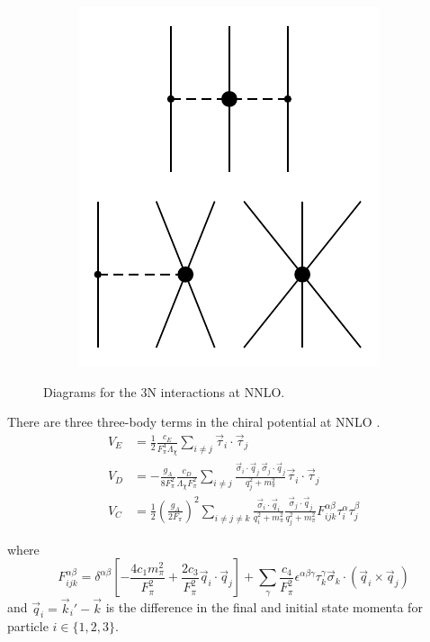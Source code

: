 \documentclass[%
 preprint,
 amsmath,amssymb,
 aps,
]{revtex4-1}
\begin{document}
\begin{figure}
\begin{subfigure}{0.25\textwidth}
\includegraphics[page=2]{Figures/3NFDiagrams}
\end{subfigure}
\caption{\label{fig:3NF}Diagrams for the 3N interactions at NNLO.}
\end{figure}

There are three three-body terms in the chiral potential at NNLO \cite{PhysRevC.66.064001}. 
\begin{align}
V_E&=\frac{1}{2}\frac{c_E }{F_\pi^4\Lambda_\chi}\sum_{i\neq j} \vec{\tau}_i\cdot\vec{\tau}_j \label{eq:V_E} \\
V_D&=-\frac{ g_A}{8F_\pi^2}\frac{c_D}{\Lambda_\chi F_\pi^2}\sum_{i\neq j } \frac{ \vec{\sigma}_i\cdot\vec{q}_j\:\vec{\sigma}_j\cdot\vec{q}_j }{q^2_j+m_\pi^2} \vec{\tau}_i\cdot\vec{\tau}_j \label{eq:V_D}\\
V_{C} &= \frac{1}{2}\left(\frac{g_A}{2F_\pi}\right)^2\sum_{i\neq j \neq k} \frac{ \vec{\sigma}_i\cdot\vec{q}_i}{q_i^2+m_\pi^2}\frac{\vec{\sigma}_j\cdot\vec{q}_j }{q^2_j+m_\pi^2} F_{ijk}^{\alpha\beta}\tau_i^{\alpha}\tau_j^\beta \label{eq:V_c}
\end{align}

where 
\begin{equation}
F_{ijk}^{\alpha\beta}=\delta^{\alpha \beta}\left[-\frac{4c_1m_\pi^2}{F_\pi^2}+\frac{2c_3}{F_\pi^2}\vec{q}_i\cdot\vec{q}_j\right]+\sum_\gamma\frac{c_4}{F_\pi^2}\epsilon^{\alpha\beta\gamma}\tau^\gamma_k\vec{\sigma}_k\cdot\left(\vec{q}_i\times\vec{q}_j\right)
\end{equation}
and $\vec{q}_i=\vec{k}_i' - \vec{k}$ is the difference in the final and initial state momenta for particle $i \in \{1,2,3\}$.
\end{document}
